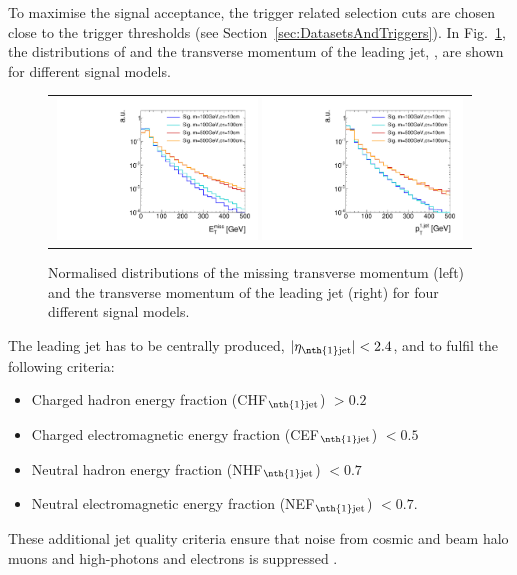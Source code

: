 To maximise the signal acceptance, the trigger related selection cuts are chosen close to the trigger thresholds (see Section~\ref{sec:DatasetsAndTriggers}).
In Fig.~\ref{fig:SignalMET+SignalJetPt}, the distributions of \met and the transverse momentum of the leading jet, \ptfirstjet, are shown for different signal models.
\begin{figure}[!b]
  \centering 
  \begin{tabular}{c}
    \includegraphics[width=0.49\textwidth]{figures/analysis/AnalysisSelection/hMetSmallRange_log_chiTracksnoSelection_4Signals.pdf}
    \includegraphics[width=0.49\textwidth]{figures/analysis/AnalysisSelection/h1stjetptSmallRange_log_chiTracksnoSelection_4Signals.pdf}
  \end{tabular}
  \caption{Normalised distributions of the missing transverse momentum (left) and the transverse momentum of the leading jet (right) for four different signal models.}
  \label{fig:SignalMET+SignalJetPt}
\end{figure}
The leading jet has to be centrally produced, $|\eta_{\text{\nth{1}jet}}|<2.4$, and to fulfil the following criteria: %
\begin{itemize}
\item Charged hadron energy fraction (CHF$_{\text{\nth{1}jet}}$) $>0.2$
\item Charged electromagnetic energy fraction (CEF$_{\text{\nth{1}jet}}$) $<0.5$
\item Neutral hadron energy fraction (NHF$_{\text{\nth{1}jet}}$) $<0.7$
\item Neutral electromagnetic energy fraction (NEF$_{\text{\nth{1}jet}}$) $<0.7$.
\end{itemize}
These additional jet quality criteria ensure that noise from cosmic and beam halo muons and high-\pt photons and electrons is suppressed \cite{bib:CMS:DM_8TeV_AN}.


